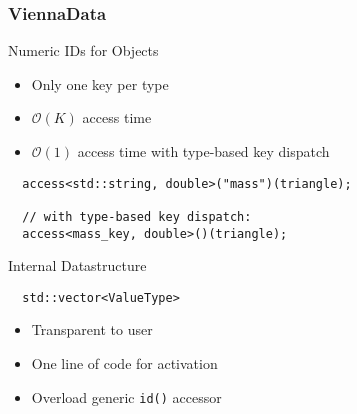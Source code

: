 


\begin{frame}[fragile]
\frametitle{ViennaData}

 \begin{block}{Numeric IDs for Objects}
   \begin{itemize}
    \item Only one key per type
    \item $\mathcal{O}(K)$ access time
    \item $\mathcal{O}(1)$ access time with type-based key dispatch
   \end{itemize}
 \end{block}
\begin{lstlisting}
  access<std::string, double>("mass")(triangle);
  
  // with type-based key dispatch:
  access<mass_key, double>()(triangle);
\end{lstlisting} 

 \begin{block}{Internal Datastructure}
\begin{lstlisting}
  std::vector<ValueType>
\end{lstlisting} 
   \begin{itemize}
    \item Transparent to user
    \item One line of code for activation
    \item Overload generic \lstinline|id()| accessor
   \end{itemize}
 \end{block}
\end{frame}





